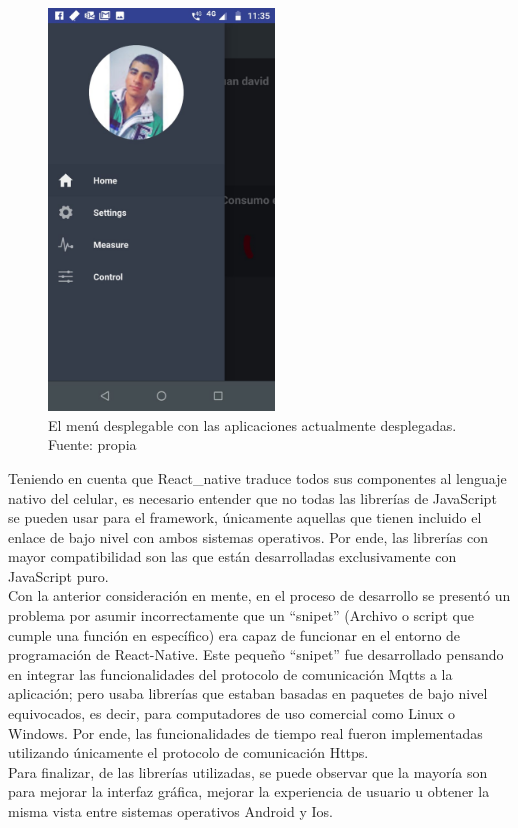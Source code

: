 \begin{figure}[htbp]
	\centerline{\includegraphics[width=6cm]{./figuras/mobile_menu.jpeg}}
	\caption{El menú desplegable con las aplicaciones actualmente desplegadas. Fuente: propia}
	\label{fig_17}
\end{figure}
Teniendo en cuenta que React\_native traduce todos sus componentes al lenguaje nativo del celular, es necesario entender que no todas las librerías de JavaScript se pueden usar para el framework, únicamente aquellas que tienen incluido el enlace de bajo nivel con ambos sistemas operativos. Por ende, las librerías con mayor compatibilidad son las que están desarrolladas exclusivamente con JavaScript puro. 
\vspace{0.5cm}\\
Con la anterior consideración en mente, en el proceso de desarrollo se presentó un problema por asumir incorrectamente que un ``snipet'' (Archivo o script que cumple una función en específico) era capaz de funcionar en el entorno de programación de React-Native. Este pequeño ``snipet'' fue desarrollado pensando en integrar las funcionalidades del protocolo de comunicación Mqtts a la aplicación; pero usaba librerías que estaban basadas en paquetes de bajo nivel equivocados, es decir, para computadores de uso comercial como Linux o Windows. Por ende, las funcionalidades de tiempo real fueron implementadas utilizando únicamente el protocolo de comunicación Https.
\vspace{0.5cm}\\
Para finalizar, de las librerías utilizadas, se puede observar que la mayoría son para mejorar la interfaz gráfica, mejorar la experiencia de usuario u obtener la misma vista entre sistemas operativos Android y Ios.

